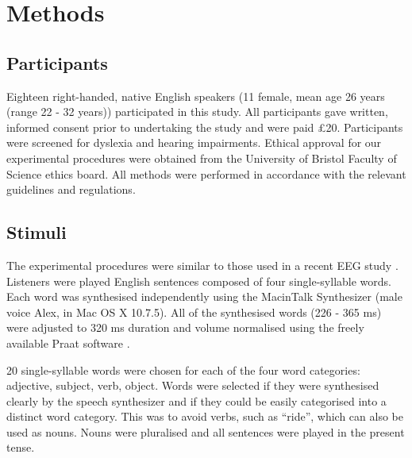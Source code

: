 \documentclass[a4paper,10pt,twoside]{article}
\begin{document}
\section*{Methods}
\subsection*{Participants}

Eighteen right-handed, native English speakers (11 female, mean age 26
years (range 22 - 32 years)) participated in this study. All
participants gave written, informed consent prior to undertaking the
study and were paid £20. Participants were screened for dyslexia and hearing impairments. Ethical approval for our experimental procedures were obtained from the University of Bristol Faculty of
Science ethics board. All methods were performed in accordance with
the relevant guidelines and regulations.

\subsection*{Stimuli}

The experimental procedures were similar to those used in a recent EEG
study \cite{DingEtAl2017}. Listeners were played English sentences
composed of four single-syllable words. Each word was synthesised
independently using the MacinTalk Synthesizer (male voice Alex, in Mac
OS X 10.7.5). All of the synthesised words (226 - 365 ms) were
adjusted to 320 ms duration and volume normalised using the freely
available Praat software \cite{BoersmaWeenink2018}.

20 single-syllable words were chosen for each of the four word
categories: adjective, subject, verb, object. Words were selected if
they were synthesised clearly by the speech synthesizer and if they
could be easily categorised into a distinct word category.  This was
to avoid verbs, such as ``ride'', which can
also be used as nouns. Nouns were pluralised and all sentences were
played in the present tense.
\end{document}
